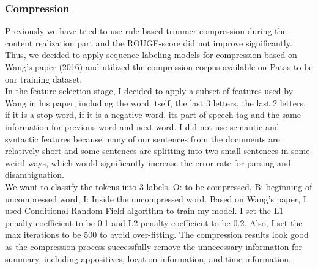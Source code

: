 \documentclass[11pt]{article}
\begin{document}
\subsubsection{Compression}
Previously we have tried to use rule-based trimmer compression during the content realization part and the ROUGE-score did not improve significantly. Thus, we decided to apply sequence-labeling models for compression based on Wang's paper (2016) and utilized the compression corpus available on Patas to be our training dataset.\\
\indent
In the feature selection stage, I decided to apply a subset of features used by Wang in his paper, including the word itself, the last 3 letters, the last 2 letters, if it is a stop word, if it is a negative word, its part-of-speech tag and the same information for previous word and next word. I did not use semantic and syntactic features because many of our sentences from the documents are relatively short and some sentences are splitting into two small sentences in some weird ways, which would significantly increase the error rate for parsing and disambiguation.\\
\indent
We want to classify the tokens into 3 labels, O: to be compressed, B: beginning of uncompressed word, I: Inside the uncompressed word. Based on Wang's paper, I used Conditional Random Field algorithm to train my model. I set the L1 penalty coefficient to be 0.1 and L2 penalty coefficient to be 0.2. Also, I set the max iterations to be 500 to avoid over-fitting. The compression results look good as the compression process successfully remove the unnecessary information for summary, including appositives, location information, and time information.  
\end{document}
